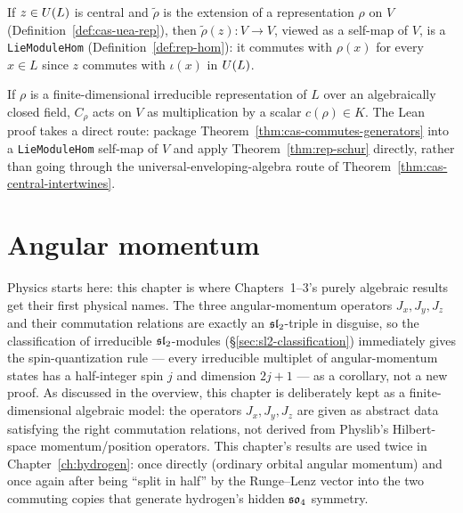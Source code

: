 \begin{theorem}
  \label{thm:cas-central-intertwines}
  \leanok
  If $z \in U(L)$ is central and $\tilde\rho$ is the extension of a
  representation $\rho$ on $V$ (Definition~\ref{def:cas-uea-rep}), then
  $\tilde\rho(z) \colon V \to V$, viewed as a self-map of $V$, is a
  \texttt{LieModuleHom} (Definition~\ref{def:rep-hom}): it commutes with
  $\rho(x)$ for every $x \in L$ since $z$ commutes with $\iota(x)$ in
  $U(L)$.
\end{theorem}

\begin{theorem}
  \label{thm:cas-scalar}
  \leanok
  If $\rho$ is a finite-dimensional irreducible representation of $L$ over an
  algebraically closed field, $C_\rho$ acts on $V$ as multiplication by a
  scalar $c(\rho) \in K$. The Lean proof takes a direct route: package
  Theorem~\ref{thm:cas-commutes-generators} into a \texttt{LieModuleHom}
  self-map of $V$ and apply Theorem~\ref{thm:rep-schur} directly, rather than
  going through the universal-enveloping-algebra route of
  Theorem~\ref{thm:cas-central-intertwines}.
\end{theorem}

\chapter{Angular momentum}
\label{ch:am}

Physics starts here: this chapter is where Chapters~1--3's purely algebraic
results get their first physical names. The three angular-momentum operators
$J_x,J_y,J_z$ and their commutation relations are exactly an $\mathfrak{sl}_2$-triple
in disguise, so the classification of irreducible $\mathfrak{sl}_2$-modules
(\S\ref{sec:sl2-classification}) immediately gives the spin-quantization rule
--- every irreducible multiplet of angular-momentum states has a half-integer
spin $j$ and dimension $2j+1$ --- as a corollary, not a new proof. As
discussed in the overview, this chapter is deliberately kept as a
finite-dimensional algebraic model: the operators $J_x,J_y,J_z$ are given as
abstract data satisfying the right commutation relations, not derived from
Physlib's Hilbert-space momentum/position operators. This chapter's results
are used twice in Chapter~\ref{ch:hydrogen}: once directly (ordinary orbital
angular momentum) and once again after being ``split in half'' by the
Runge--Lenz vector into the two commuting copies that generate hydrogen's
hidden $\mathfrak{so}_4$ symmetry.


